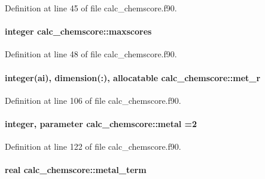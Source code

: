 Definition at line 45 of file calc\-\_\-chemscore.\-f90.

\hypertarget{classcalc__chemscore_a17d6933892fcc2b0199a9946b8d761a3}{
\paragraph[{maxscores}]{\setlength{\rightskip}{0pt plus 5cm}integer calc\-\_\-chemscore\-::maxscores}}\label{classcalc__chemscore_a17d6933892fcc2b0199a9946b8d761a3}


Definition at line 48 of file calc\-\_\-chemscore.\-f90.

\hypertarget{classcalc__chemscore_a8d928ea8b4d7dd3d55c900989dd2349a}{
\paragraph[{met\-\_\-r}]{\setlength{\rightskip}{0pt plus 5cm}integer(ai), dimension(\-:), allocatable calc\-\_\-chemscore\-::met\-\_\-r}}\label{classcalc__chemscore_a8d928ea8b4d7dd3d55c900989dd2349a}


Definition at line 106 of file calc\-\_\-chemscore.\-f90.

\hypertarget{classcalc__chemscore_a9e666817bc6f8db23e5265e8192ffe0d}{
\paragraph[{metal}]{\setlength{\rightskip}{0pt plus 5cm}integer, parameter calc\-\_\-chemscore\-::metal =2}}\label{classcalc__chemscore_a9e666817bc6f8db23e5265e8192ffe0d}


Definition at line 122 of file calc\-\_\-chemscore.\-f90.

\hypertarget{classcalc__chemscore_ad0445c5c5fe8d2e46a1c07680f3d69d1}{
\paragraph[{metal\-\_\-term}]{\setlength{\rightskip}{0pt plus 5cm}real calc\-\_\-chemscore\-::metal\-\_\-term}}\label{classcalc__chemscore_ad0445c5c5fe8d2e46a1c07680f3d69d1}


